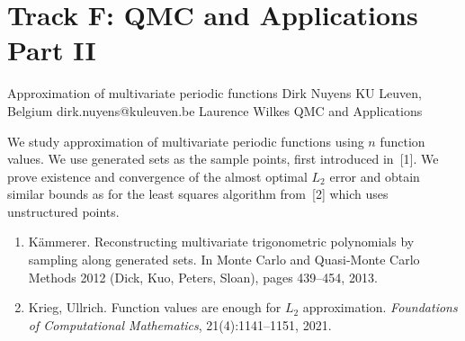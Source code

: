 \section{Track F: QMC and Applications Part II}\newpage

\begin{talk}
  {Approximation of multivariate periodic functions}%
  {Dirk Nuyens}%
  {KU Leuven, Belgium}%
  {dirk.nuyens@kuleuven.be}%
  {Laurence Wilkes}%
  {QMC and Applications}%
    
   
  We study approximation of multivariate periodic functions using $n$
  function values. We use generated sets as the sample points, first
  introduced in~[1]. We prove existence and convergence of the almost
  optimal $L_2$ error and obtain similar bounds as for the least squares
  algorithm from~[2] which uses unstructured points.

\medskip

\begin{enumerate}
  \item[{[1]}]
    K{\"a}mmerer.
    Reconstructing multivariate trigonometric polynomials by sampling along generated sets.
    In Monte Carlo and Quasi-Monte Carlo Methods 2012 (Dick, Kuo, Peters, Sloan), pages 439--454, 2013.
  \item[{[2]}]
    Krieg, Ullrich.
    Function values are enough for $L_2$ approximation.
    \emph{Foundations of Computational Mathematics}, 21(4):1141--1151, 2021.
\end{enumerate}

\end{talk}

